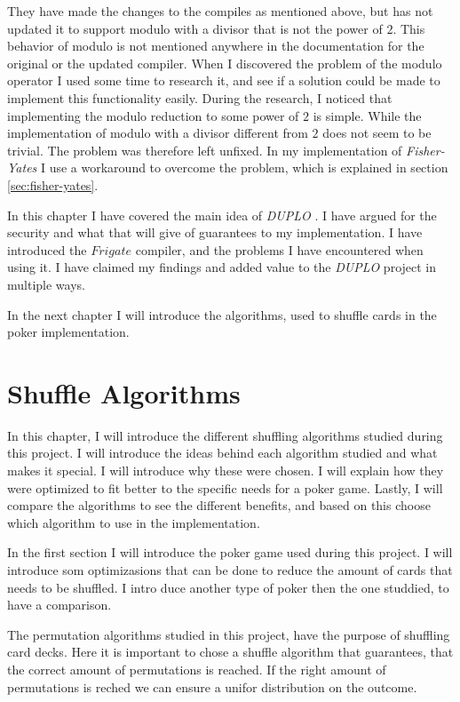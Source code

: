 \documentclass[twoside,11pt,openright]{report}
\newcommand{\FY}{\textit{Fisher-Yates} }
\newcommand{\DUPLO}{\textit{DUPLO} }
\begin{document}
They have made the changes to the compiles as mentioned above, but has not updated it to support modulo with a divisor that is not the power of $2$. This behavior of modulo is not mentioned anywhere in the documentation for the original or the updated compiler. When I discovered the problem of the modulo operator I used some time to research it, and see if a solution could be made to implement this functionality easily. During the research, I noticed that implementing the modulo reduction to some power of $2$ is simple. While the implementation of modulo with a divisor different from $2$ does not seem to be trivial. The problem was therefore left unfixed. In my implementation of \FY I use a workaround to overcome the problem, which is explained in section \ref{sec:fisher-yates}.

\bigskip

In this chapter I have covered the main idea of \DUPLO. I have argued for the security and what that will give of guarantees to my implementation. I have introduced the $Frigate$ compiler, and the problems I have encountered when using it. I have claimed my findings and added value to the \DUPLO project in multiple ways.

In the next chapter I will introduce the algorithms, used to shuffle cards in the poker implementation.


\chapter{Shuffle Algorithms}
\label{ch:shuffle}
In this chapter, I will introduce the different shuffling algorithms studied during this project. I will introduce the ideas behind each algorithm studied and what makes it special. I will introduce why these were chosen. I will explain how they were optimized to fit better to the specific needs for a poker game. Lastly, I will compare the algorithms to see the different benefits, and based on this choose which algorithm to use in the implementation.

In the first section I will introduce the poker game used during this project. I will introduce som optimizasions that can be done to reduce the amount of cards that needs to be shuffled. I intro duce another type of poker then the one studdied, to have a comparison.

The permutation algorithms studied in this project, have the purpose of shuffling card decks. Here it is important to chose a shuffle algorithm that guarantees, that the correct amount of permutations is reached. If the right amount of permutations is reched we can ensure a unifor distribution on the outcome.
\end{document}

